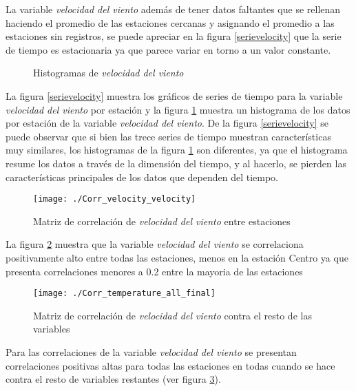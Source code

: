 La variable {\em velocidad del viento} además de tener datos faltantes que se rellenan haciendo el promedio de las estaciones cercanas y asignando el promedio a las estaciones sin registros, se puede apreciar en la figura \ref{serievelocity} que la serie de tiempo es estacionaria ya que parece variar en torno a un valor constante.

\begin{figure}[H]
\centering
{}
\caption{Histogramas de {\em velocidad del viento}}
\label{histvelocity}
\end{figure}

La figura \ref{serievelocity} muestra los gráficos de series de tiempo para la variable {\em velocidad del viento} por estación y la figura \ref{histvelocity} muestra un histograma de los datos por estación de la variable {\em velocidad del viento}. De la figura \ref{serievelocity} se puede observar que si bien las trece series de tiempo muestran características muy similares, los histogramas de la figura \ref{histvelocity} son diferentes, ya que el histograma resume los datos a través de la dimensión del tiempo, y al hacerlo, se pierden las características principales de los datos que dependen del tiempo.

\begin{figure}[H]
\centering
\texttt{[image: ./Corr\_velocity\_velocity]}
\caption{Matriz de correlación de {\em velocidad del viento} entre estaciones }
\label{corrvelocity2}
\end{figure}

La figura \ref{corrvelocity2} muestra que la variable {\em velocidad del viento} se correlaciona positivamente alto entre todas las estaciones, menos en la estación Centro ya que presenta correlaciones menores a 0.2 entre la mayoria de las estaciones 

\begin{figure}[H]
\centering
\texttt{[image: ./Corr\_temperature\_all\_final]}
\caption{Matriz de correlación de {\em velocidad del viento} contra el resto de las variables}
\label{corrvelocity}
\end{figure}


Para las correlaciones de la variable {\em velocidad del viento} se presentan correlaciones positivas altas para todas las estaciones en todas cuando se hace contra el resto de variables restantes (ver figura \ref{corrvelocity}).





